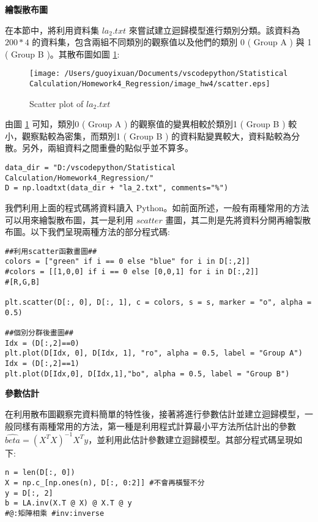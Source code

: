 \textbf{繪製散布圖}

在本節中，將利用資料集 $la_2.txt$ 來嘗試建立迴歸模型進行類別分類。該資料為 $200*4$ 的資料集，包含兩組不同類別的觀察值以及他們的類別 0 ( Group A ) 與 1 ( Group B )。其散布圖如圖 \ref{fig:scatter plot}:

\begin{figure}[H]
    \centering
        \texttt{[image: /Users/guoyixuan/Documents/vscodepython/Statistical Calculation/Homework4\_Regression/image\_hw4/scatter.eps]}
    \caption{Scatter plot of $la_2.txt$}
    \label{fig:scatter plot}
\end{figure}

由圖 \ref{fig:scatter plot} 可知，類別0 ( Group A ) 的觀察值的變異相較於類別1 ( Group B ) 較小，觀察點較為密集，而類別1 ( Group B ) 的資料點變異較大，資料點較為分散。另外，兩組資料之間重疊的點似乎並不算多。

\bigskip
\begin{lstlisting}
data_dir = "D:/vscodepython/Statistical Calculation/Homework4_Regression/"
D = np.loadtxt(data_dir + "la_2.txt", comments="%")
\end{lstlisting}

我們利用上面的程式碼將資料讀入 Python。如前面所述，一般有兩種常用的方法可以用來繪製散布圖，其一是利用 $scatter$ 畫圖，其二則是先將資料分開再繪製散布圖。以下我們呈現兩種方法的部分程式碼:

\bigskip
\begin{lstlisting}
##利用scatter函數畫圖##
colors = ["green" if i == 0 else "blue" for i in D[:,2]] 
#colors = [[1,0,0] if i == 0 else [0,0,1] for i in D[:,2]] 
#[R,G,B]

plt.scatter(D[:, 0], D[:, 1], c = colors, s = s, marker = "o", alpha = 0.5)

##個別分群後畫圖##
Idx = (D[:,2]==0) 
plt.plot(D[Idx, 0], D[Idx, 1], "ro", alpha = 0.5, label = "Group A")
Idx = (D[:,2]==1)
plt.plot(D[Idx,0], D[Idx,1],"bo", alpha = 0.5, label = "Group B")
\end{lstlisting}

\textbf{參數估計}

在利用散布圖觀察完資料簡單的特性後，接著將進行參數估計並建立迴歸模型，一般同樣有兩種常用的方法，第一種是利用程式計算最小平方法所估計出的參數 $\hat{beta}=(X^{T}X)^{-1}X^{T}y$，並利用此估計參數建立迴歸模型。其部分程式碼呈現如下:

\bigskip
\begin{lstlisting}
n = len(D[:, 0])
X = np.c_[np.ones(n), D[:, 0:2]] #不會再橫豎不分
y = D[:, 2] 
b = LA.inv(X.T @ X) @ X.T @ y
#@:矩陣相乘 #inv:inverse
\end{lstlisting}

